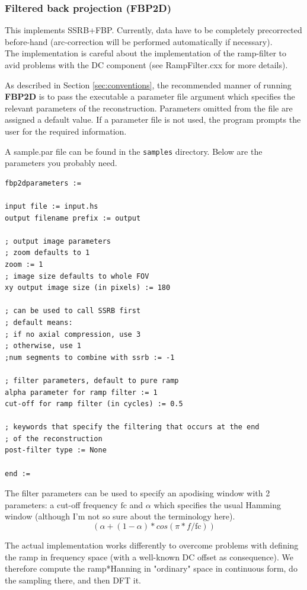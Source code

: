 \documentclass{article}
\begin{document}
\subsubsection{
Filtered back projection (FBP2D)}

This implements SSRB+FBP. Currently, data have to be completely 
precorrected before-hand (arc-correction will be performed automatically
if necessary).\\
The implementation is careful about the implementation of the 
ramp-filter to avid problems with the DC component (see RampFilter.cxx 
for more details).



As described in Section \ref{sec:conventions}, the recommended manner of running \textbf{FBP2D}  
is to pass the executable a parameter file argument which specifies 
the relevant parameters of the reconstruction. Parameters omitted 
from the file are assigned a default value. If a parameter file 
is not used, the program prompts the user for the required information.


A sample.par file can be found in the \texttt{samples} directory. 
Below are the parameters you probably need.


\begin{verbatim}
fbp2dparameters :=

input file := input.hs
output filename prefix := output

; output image parameters
; zoom defaults to 1
zoom := 1
; image size defaults to whole FOV
xy output image size (in pixels) := 180

; can be used to call SSRB first
; default means: 
; if no axial compression, use 3 
; otherwise, use 1
;num segments to combine with ssrb := -1

; filter parameters, default to pure ramp
alpha parameter for ramp filter := 1
cut-off for ramp filter (in cycles) := 0.5

; keywords that specify the filtering that occurs at the end
; of the reconstruction
post-filter type := None

end := 
\end{verbatim}

The filter parameters can be used to specify an apodising window with 2 parameters: 
a cut-off frequency $\mathrm{fc}$ and $\alpha$ which specifies the usual 
  Hamming window (although I'm not so sure about the terminology here). 
\[
   (\alpha + (1 - \alpha) * cos(\pi * f / \mathrm{fc}))
\]

  The actual implementation works differently to overcome problems with defining the ramp in frequency 
  space (with a well-known DC offset as consequence). We therefore compute the ramp*Hanning in 
  "ordinary" space in continuous form, do the sampling there, and then DFT it. 
\end{document}
